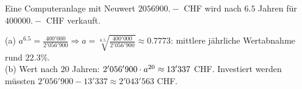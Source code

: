 \documentclass[11pt]{exam}
\begin{document}
\begin{questions}
\noaddpoints
\question[\totalpoints]
\addpoints
Eine Computeranlage mit Neuwert $2056900.-$ CHF wird nach $6.5$ Jahren für $400000.-$ CHF verkauft.
{\begin{solution}
		(a) $a^{6.5}=\frac{400'000}{2'056'900}\Rightarrow a=\sqrt[6.5]{\frac{400'000}{2'056'900}}\approx0.7773$: mittlere jährliche Wertabnahme rund $22.3\%$.\\
		(b) Wert nach $20$ Jahren: $2'056'900\cdot a^{20}\approx13'337$ CHF. Investiert werden müssten $2'056'900-13'337\approx2'043'563$ CHF.
\end{solution}}
{}


\end{questions}
\end{document}
